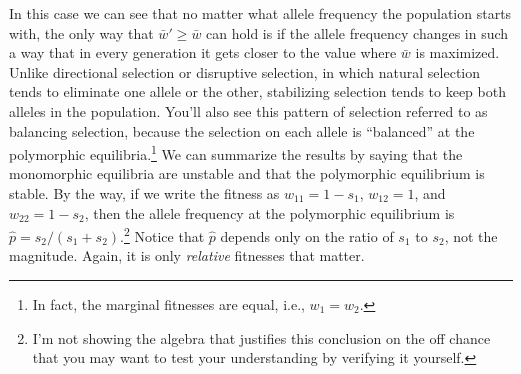 \documentclass[12pt]{article}
\begin{document}
In this case we can see that no matter what allele frequency the
population starts with, the only way that $\bar w' \ge \bar w$ can
hold is if the allele frequency changes in such a way that in every
generation it gets closer to the value where $\bar w$ is
maximized. Unlike directional selection or disruptive selection, in
which natural selection tends to eliminate one allele or the other,
stabilizing selection tends to keep both alleles in the
population. You'll also see this pattern of selection referred to as
balancing selection, because the selection on each allele is
``balanced'' at the polymorphic equilibria.\footnote{In fact, the
  marginal fitnesses are equal, i.e., $w_1=w_2$.} We can summarize the
results by saying that the monomorphic equilibria are unstable and
that the polymorphic equilibrium is stable. By the way, if we write
the fitness as $w_{11} = 1 - s_1$, $w_{12}=1$, and $w_{22}=1-s_2$,
then the allele frequency at the polymorphic equilibrium is $\hat
p=s_2/(s_1+s_2)$.\footnote{I'm not showing the algebra that justifies
  this conclusion on the off chance that you may want to test your
  understanding by verifying it yourself.} Notice that $\hat p$
depends only on the ratio of $s_1$ to $s_2$, not the magnitude. Again,
it is only {\it relative\/} fitnesses that matter.

\ccLicense
\end{document}
